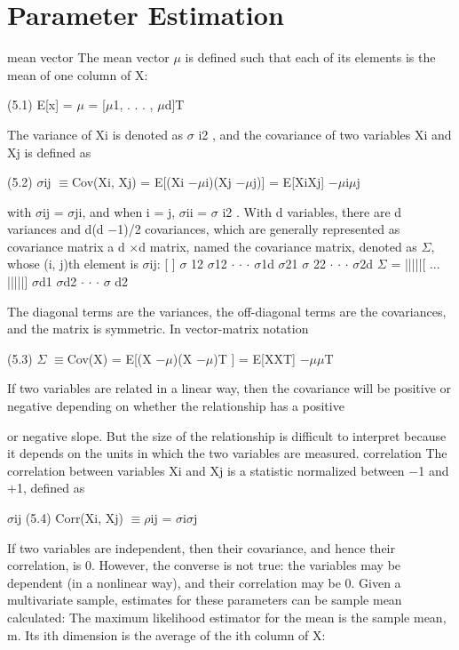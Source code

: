 \section{Parameter Estimation}

mean vector The mean vector $\mu$ is defined such that each of its elements is the mean of one column of X:

(5.1) E[x] = $\mu$ = [$\mu$1, . . . , $\mu$d]T

The variance of Xi is denoted as $\sigma$ i2 , and the covariance of two variables Xi and Xj is defined as

(5.2) $\sigma$ij $\equiv$Cov(Xi, Xj) = E[(Xi $-$$\mu$i)(Xj $-$$\mu$j)] = E[XiXj] $-$$\mu$i$\mu$j

with $\sigma$ij = $\sigma$ji, and when i = j, $\sigma$ii = $\sigma$ i2 . With d variables, there are d variances and d(d $-$1)/2 covariances, which are generally represented as covariance matrix a d $\times$d matrix, named the covariance matrix, denoted as $\Sigma$, whose (i, j)th element is $\sigma$ij: [ ] $\sigma$ 12 $\sigma$12 $\cdot$ $\cdot$ $\cdot$ $\sigma$1d $\sigma$21 $\sigma$ 22 $\cdot$ $\cdot$ $\cdot$ $\sigma$2d $\Sigma$ = |||||[ ... |||||] $\sigma$d1 $\sigma$d2 $\cdot$ $\cdot$ $\cdot$ $\sigma$ d2

The diagonal terms are the variances, the off-diagonal terms are the covariances, and the matrix is symmetric. In vector-matrix notation

(5.3) $\Sigma$ $\equiv$Cov(X) = E[(X $-$$\mu$)(X $-$$\mu$)T ] = E[XXT] $-$$\mu$$\mu$T

If two variables are related in a linear way, then the covariance will be positive or negative depending on whether the relationship has a positive

or negative slope. But the size of the relationship is difficult to interpret because it depends on the units in which the two variables are measured. correlation The correlation between variables Xi and Xj is a statistic normalized between $-$1 and +1, defined as

$\sigma$ij (5.4) Corr(Xi, Xj) $\equiv$$\rho$ij = $\sigma$i$\sigma$j

If two variables are independent, then their covariance, and hence their correlation, is 0. However, the converse is not true: the variables may be dependent (in a nonlinear way), and their correlation may be 0. Given a multivariate sample, estimates for these parameters can be sample mean calculated: The maximum likelihood estimator for the mean is the sample mean, m. Its ith dimension is the average of the ith column of X:

